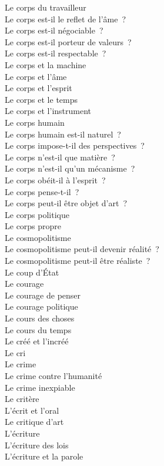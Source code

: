 \documentclass[a4paper,12pt]{article}
\begin{document}
Le corps du travailleur \\
Le corps est-il le reflet de l'âme ? \\
Le corps est-il négociable ? \\
Le corps est-il porteur de valeurs ? \\
Le corps est-il respectable ? \\
Le corps et la machine \\
Le corps et l'âme \\
Le corps et l'esprit \\
Le corps et le temps \\
Le corps et l'instrument \\
Le corps humain \\
Le corps humain est-il naturel ? \\
Le corps impose-t-il des perspectives ? \\
Le corps n'est-il que matière ? \\
Le corps n'est-il qu'un mécanisme ? \\
Le corps obéit-il à l'esprit ? \\
Le corps pense-t-il ? \\
Le corps peut-il être objet d'art ? \\
Le corps politique \\
Le corps propre \\
Le cosmopolitisme \\
Le cosmopolitisme peut-il devenir réalité ? \\
Le cosmopolitisme peut-il être réaliste ? \\
Le coup d'État \\
Le courage \\
Le courage de penser \\
Le courage politique \\
Le cours des choses \\
Le cours du temps \\
Le créé et l'incréé \\
Le cri \\
Le crime \\
Le crime contre l'humanité \\
Le crime inexpiable \\
Le critère \\
L'écrit et l'oral \\
Le critique d'art \\
L'écriture \\
L'écriture des lois \\
L'écriture et la parole \\
\end{document}
